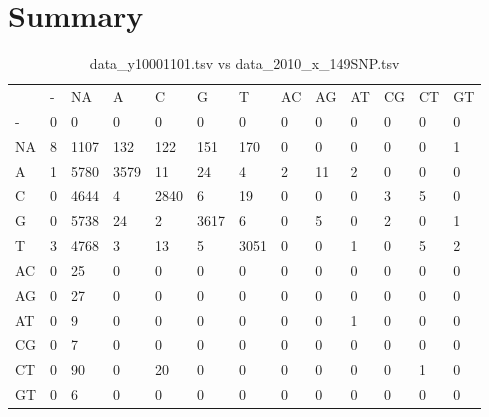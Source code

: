 \section{Summary} \label{section_summary}
\begin{center}
\begin{longtable}{|l|l|l|l|l|l|l|l|l|l|l|l|l|}
\caption{data\_y10001101.tsv vs data\_2010\_x\_149SNP.tsv} \label{table_dm0}\\
\hline
\\
\hline
&-&NA&A&C&G&T&AC&AG&AT&CG&CT&GT\\
-&0&0&0&0&0&0&0&0&0&0&0&0\\
NA&8&1107&132&122&151&170&0&0&0&0&0&1\\
A&1&5780&3579&11&24&4&2&11&2&0&0&0\\
C&0&4644&4&2840&6&19&0&0&0&3&5&0\\
G&0&5738&24&2&3617&6&0&5&0&2&0&1\\
T&3&4768&3&13&5&3051&0&0&1&0&5&2\\
AC&0&25&0&0&0&0&0&0&0&0&0&0\\
AG&0&27&0&0&0&0&0&0&0&0&0&0\\
AT&0&9&0&0&0&0&0&0&1&0&0&0\\
CG&0&7&0&0&0&0&0&0&0&0&0&0\\
CT&0&90&0&20&0&0&0&0&0&0&1&0\\
GT&0&6&0&0&0&0&0&0&0&0&0&0\\
\hline
\end{longtable}
\end{center}

